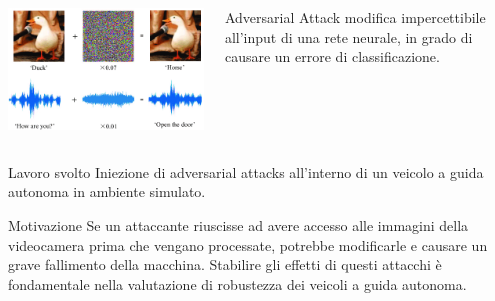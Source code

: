 \documentclass{beamer}
\begin{document}
\begin{frame}
    \begin{columns}
        \begin{column}{0.5\textwidth}
            \includegraphics[width=\textwidth]{adv}
        \end{column}
    \begin{column}{0.5\textwidth}
       \begin{block}{ Adversarial Attack}
        modifica impercettibile all'input di una rete neurale, in grado
        di causare un errore di classificazione.
       \end{block}
    \end{column}
    \end{columns}
\end{frame}

\begin{frame}
    \begin{block}{Lavoro svolto}
        Iniezione di  adversarial attacks all'interno di un veicolo a guida autonoma in ambiente simulato.
    \end{block}
   \begin{block}{Motivazione}
       Se un attaccante riuscisse ad avere accesso alle immagini della videocamera prima che vengano processate, potrebbe
       modificarle e causare un grave fallimento della macchina. Stabilire gli effetti di questi attacchi è fondamentale nella valutazione
       di robustezza dei veicoli a guida autonoma.
   \end{block}
\end{frame}
\end{document}
